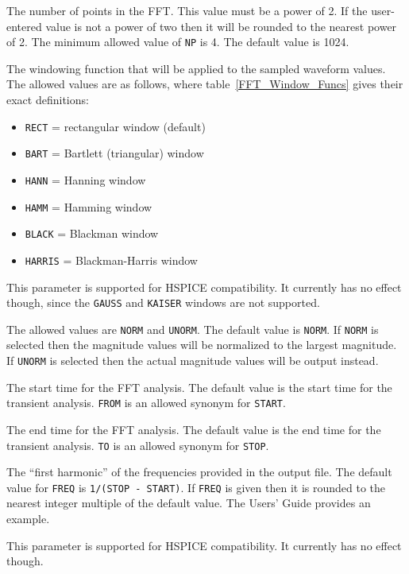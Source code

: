 \begin{Command}
\begin {Arguments}
The number of points in the FFT.  This value must be a power of 2.  If
the user-entered value is not a power of two then it will be rounded to
the nearest power of 2.  The minimum allowed value of {\tt NP} is 4.
The default value is 1024.

The windowing function that will be applied to the sampled waveform
values.  The allowed values are as follows, where table~\ref{FFT_Window_Funcs}
gives their exact definitions:

\begin{itemize}
  \item \texttt{RECT} = rectangular window (default)
  \item \texttt{BART} = Bartlett (triangular) window
  \item \texttt{HANN} = Hanning window
  \item \texttt{HAMM} = Hamming window
  \item \texttt{BLACK} = Blackman window
  \item \texttt{HARRIS} = Blackman-Harris window
\end{itemize}

This parameter is supported for HSPICE compatibility. It currently
has no effect though, since the {\tt GAUSS} and {\tt KAISER} windows
are not supported.

The allowed values are {\tt NORM} and {\tt UNORM}.  The default
value is {\tt NORM}. If {\tt NORM} is selected then the magnitude
values will be normalized to the largest magnitude.  If {\tt UNORM}
is selected then the actual magnitude values will be output instead.

The start time for the FFT analysis.  The default value is the
start time for the transient analysis. {\tt FROM} is an allowed
synonym for {\tt START}.

The end time for the FFT analysis.  The default value is the
end time for the transient analysis. {\tt TO} is an allowed
synonym for {\tt STOP}.

The ``first harmonic'' of the frequencies provided in the output
file.  The default value for {\tt FREQ} is {\tt 1/(STOP - START)}.
If {\tt FREQ} is given then it is rounded to the nearest integer
multiple of the default value.  The \Xyce{} Users' Guide\UsersGuide
provides an example.

This parameter is supported for HSPICE compatibility. It currently
has no effect though.


\end{Arguments}
\end{Command}

